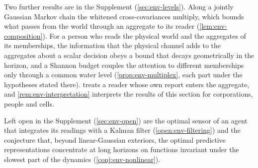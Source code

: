 Two further results are in the Supplement (\cref{sec:env-levels}). Along a jointly Gaussian Markov chain the whitened cross-covariances multiply, which bounds what passes from the world through an aggregate to its reader (\cref{lem:env-composition}). For a person who reads the physical world and the aggregates of its memberships, the information that the physical channel adds to the aggregates about a scalar decision obeys a bound that decays geometrically in the horizon, and a Shannon budget couples the attention to different memberships only through a common water level (\cref{prop:env-multiplex}, each part under the hypotheses stated there).  treats a reader whose own report enters the aggregate, and \cref{rem:env-interpretation} interprets the results of this section for corporations, people and cells.

Left open in the Supplement (\cref{sec:env-open}) are the optimal sensor of an agent that integrates its readings with a Kalman filter (\cref{open:env-filtering}) and the conjecture that, beyond linear-Gaussian exteriors, the optimal predictive representations concentrate at long horizons on functions invariant under the slowest part of the dynamics (\cref{conj:env-nonlinear}).
